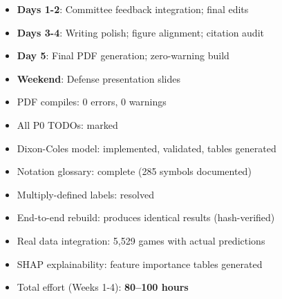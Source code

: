 \begin{itemize}
  \item \textbf{Days 1-2}: Committee feedback integration; final edits
  \item \textbf{Days 3-4}: Writing polish; figure alignment; citation audit
  \item \textbf{Day 5}: Final PDF generation; zero-warning build
  \item \textbf{Weekend}: Defense presentation slides
\end{itemize}

\begin{itemize}
  \item PDF compiles: 0 errors, 0 warnings \done
  \item All P0 TODOs: marked \done
  \item Dixon-Coles model: implemented, validated, tables generated \done
  \item Notation glossary: complete (285 symbols documented) \done
  \item Multiply-defined labels: resolved \done
  \item End-to-end rebuild: produces identical results (hash-verified)
  \item Real data integration: 5,529 games with actual predictions \done
  \item SHAP explainability: feature importance tables generated \done
  \item Total effort (Weeks 1-4): \textbf{80--100 hours} \done
\end{itemize}


